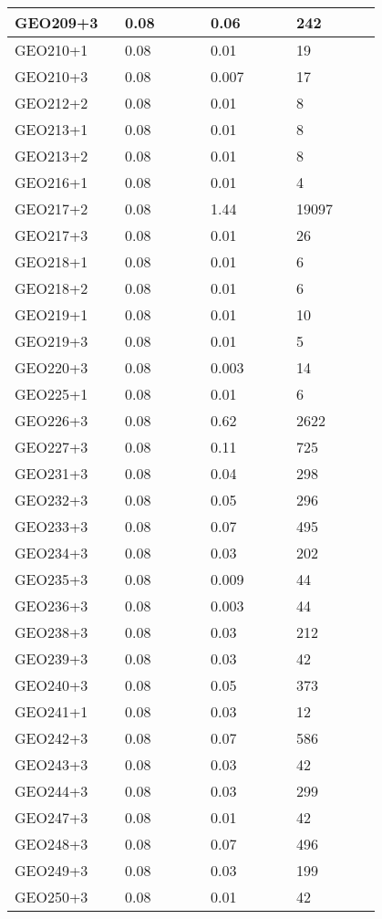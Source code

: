 \begin{longtable}[H]{|p{0.2\linewidth}|p{0.2\linewidth}|p{0.2\linewidth}|p{0.2\linewidth}|}
\hline
GEO209+3 & 0.08 & 0.06 & 242 \\
\hline
GEO210+1 & 0.08 & 0.01 & 19 \\
\hline
GEO210+3 & 0.08 & 0.007 & 17 \\
\hline
GEO212+2 & 0.08 & 0.01 & 8 \\
\hline
GEO213+1 & 0.08 & 0.01 & 8 \\
\hline
GEO213+2 & 0.08 & 0.01 & 8 \\
\hline
GEO216+1 & 0.08 & 0.01 & 4 \\
\hline
GEO217+2 & 0.08 & 1.44 & 19097 \\
\hline
GEO217+3 & 0.08 & 0.01 & 26 \\
\hline
GEO218+1 & 0.08 & 0.01 & 6 \\
\hline
GEO218+2 & 0.08 & 0.01 & 6 \\
\hline
GEO219+1 & 0.08 & 0.01 & 10 \\
\hline
GEO219+3 & 0.08 & 0.01 & 5 \\
\hline
GEO220+3 & 0.08 & 0.003 & 14 \\
\hline
GEO225+1 & 0.08 & 0.01 & 6 \\
\hline
GEO226+3 & 0.08 & 0.62 & 2622 \\
\hline
GEO227+3 & 0.08 & 0.11 & 725 \\
\hline
GEO231+3 & 0.08 & 0.04 & 298 \\
\hline
GEO232+3 & 0.08 & 0.05 & 296 \\
\hline
GEO233+3 & 0.08 & 0.07 & 495 \\
\hline
GEO234+3 & 0.08 & 0.03 & 202 \\
\hline
GEO235+3 & 0.08 & 0.009 & 44 \\
\hline
GEO236+3 & 0.08 & 0.003 & 44 \\
\hline
GEO238+3 & 0.08 & 0.03 & 212 \\
\hline
GEO239+3 & 0.08 & 0.03 & 42 \\
\hline
GEO240+3 & 0.08 & 0.05 & 373 \\
\hline
GEO241+1 & 0.08 & 0.03 & 12 \\
\hline
GEO242+3 & 0.08 & 0.07 & 586 \\
\hline
GEO243+3 & 0.08 & 0.03 & 42 \\
\hline 
GEO244+3 & 0.08 & 0.03 & 299 \\
\hline
GEO247+3 & 0.08 & 0.01 & 42 \\
\hline
GEO248+3 & 0.08 & 0.07 & 496 \\
\hline
GEO249+3 & 0.08 & 0.03 & 199 \\
\hline
GEO250+3 & 0.08 & 0.01 & 42 \\

\end{longtable}
